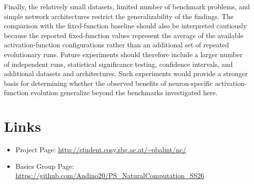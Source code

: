\documentclass[12pt,fleqn,a4paper]{article}
\begin{document}
Finally, the relatively small datasets, limited number of benchmark problems, and simple network architectures restrict the generalizability of the findings. The comparison with the fixed-function baseline should also be interpreted cautiously because the reported fixed-function values represent the average of the available activation-function configurations rather than an additional set of repeated evolutionary runs. Future experiments should therefore include a larger number of independent runs, statistical significance testing, confidence intervals, and additional datasets and architectures. Such experiments would provide a stronger basis for determining whether the observed benefits of neuron-specific activation-function evolution generalize beyond the benchmarks investigated here.
\newpage

\section{Links}

\begin{itemize}
\item Project Page: \url{http://student.cosy.sbg.ac.at/~pbalint/nc/}
\item Basics Group Page: \url{https://github.com/Andino20/PS_NaturalComputation_SS26
}

\end{itemize}


\end{document}
